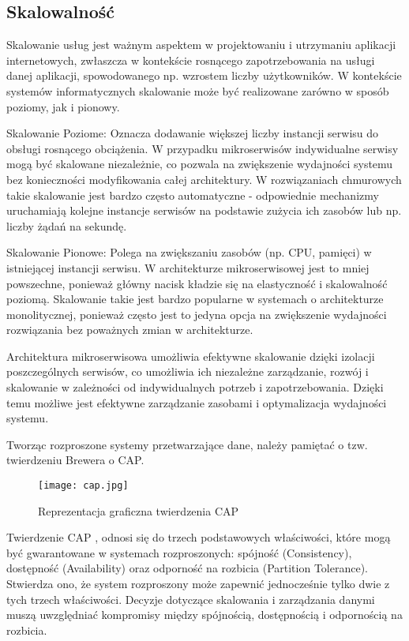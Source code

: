 \subsection{Skalowalność}

Skalowanie usług jest ważnym aspektem w projektowaniu i utrzymaniu aplikacji internetowych, zwłaszcza w kontekście rosnącego zapotrzebowania na usługi danej aplikacji, spowodowanego np. wzrostem liczby użytkowników. W kontekście systemów informatycznych skalowanie może być realizowane zarówno w sposób poziomy, jak i pionowy.

Skalowanie Poziome: Oznacza dodawanie większej liczby instancji serwisu do obsługi rosnącego obciążenia. W przypadku mikroserwisów indywidualne serwisy mogą być skalowane niezależnie, co pozwala na zwiększenie wydajności systemu bez konieczności modyfikowania całej architektury. W rozwiązaniach chmurowych takie skalowanie jest bardzo często automatyczne - odpowiednie mechanizmy uruchamiają kolejne instancje serwisów na podstawie zużycia ich zasobów lub np. liczby żądań na sekundę.

Skalowanie Pionowe: Polega na zwiększaniu zasobów (np. CPU, pamięci) w istniejącej instancji serwisu. W architekturze mikroserwisowej jest to mniej powszechne, ponieważ główny nacisk kładzie się na elastyczność i skalowalność poziomą. Skalowanie takie jest bardzo popularne w systemach o architekturze monolitycznej, ponieważ często jest to jedyna opcja na zwiększenie wydajności rozwiązania bez poważnych zmian w architekturze.

Architektura mikroserwisowa umożliwia efektywne skalowanie dzięki izolacji poszczególnych serwisów, co umożliwia ich niezależne zarządzanie, rozwój i skalowanie w zależności od indywidualnych potrzeb i zapotrzebowania. Dzięki temu możliwe jest efektywne zarządzanie zasobami i optymalizacja wydajności systemu.

Tworząc rozproszone systemy przetwarzające dane, należy pamiętać o tzw. twierdzeniu Brewera o CAP.

\begin{figure}[!h]
    \centering \texttt{[image: cap.jpg]}
    \caption{Reprezentacja graficzna twierdzenia CAP \cite{cap_rys}}
\end{figure}

Twierdzenie CAP \cite{cap}, odnosi się do trzech podstawowych właściwości, które mogą być gwarantowane w systemach rozproszonych: spójność (Consistency), dostępność (Availability) oraz odporność na rozbicia (Partition Tolerance). Stwierdza ono, że system rozproszony może zapewnić jednocześnie tylko dwie z tych trzech właściwości. Decyzje dotyczące skalowania i zarządzania danymi muszą uwzględniać kompromisy między spójnością, dostępnością i odpornością na rozbicia.

